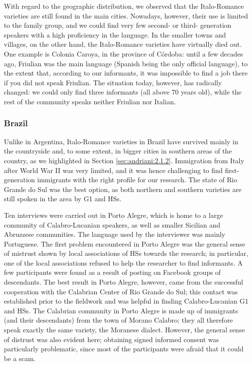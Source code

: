 \documentclass[output=paper,hidelinks]{langscibook}
\begin{document}
\hspace*{-3pt}With regard to the geographic distribution, we observed that the Italo-Romance varieties are still found in the main cities. Nowadays, however, their use is limited to the family group, and we could find very few second- or third- generation speakers with a high proficiency in the language. In the smaller towns and villages, on the other hand, the Italo-Romance varieties have virtually died out. One example is Colonia Caroya, in the province of Córdoba: until a few decades ago, Friulian was the main language (Spanish being the only official language), to the extent that, according to our informants, it was impossible to find a job there if you did not speak Friulian. The situation today, however, has radically changed: we could only find three informants (all above 70 years old), while the rest of the community speaks neither Friulian nor Italian.

\subsubsection{Brazil}

Unlike in Argentina, Italo-Romance varieties in Brazil have survived mainly in the countryside and, to some extent, in bigger cities in southern areas of the country, as we highlighted in Section \ref{sec:andriani:2.1.2}. Immigration from Italy after World War II was very limited, and it was hence challenging to find first-generation immigrants with the right profile for our research. The state of Rio Grande do Sul was the best option, as both northern and southern varieties are still spoken in the area by G1 and HSs.

Ten interviews were carried out in Porto Alegre, which is home to a large community of Calabro-Lucanian speakers, as well as smaller Sicilian and Abruzzese communities. The language used by the interviewer was mainly Portuguese. The first problem encountered in Porto Alegre was the general sense of mistrust shown by local associations of HSs towards the research; in particular, one of the local associations refused to help the researcher to find informants. A few participants were found as a result of posting on Facebook groups of descendants. The best result in Porto Alegre, however, came from the successful cooperation with the Calabrian Center of Rio Grande do Sul; this contact was established prior to the fieldwork and was helpful in finding Calabro-Lucanian G1 and HSs. The Calabrian community in Porto Alegre is made up of immigrants (and their descendants) from the town of Morano Calabro; they all therefore speak exactly the same variety, the Moranese dialect. However, the general sense of distrust was also evident here; obtaining signed informed consent was particularly problematic, since most of the participants were afraid that it could be a scam. 
\end{document}

